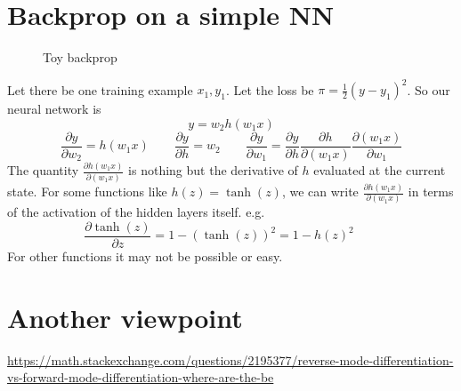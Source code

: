 \documentclass{article}
\newcommand{\beq}{\begin{equation}}
\newcommand{\eeq}{\end{equation}}
\newcommand{\pdd}[2]{\frac{\partial{#1}}{\partial{#2}}}
\begin{document}
\section{Backprop on a simple NN}
\begin{figure}
  \centering
{}
\caption{\label{fig:toybackprop} Toy backprop}
\end{figure}
Let there be one training example $x_1,y_1$. Let the loss be $\pi=\frac{1}{2}(y-y_1)^2$. So our neural network is
\beq
y = w_2h(w_1x)
\eeq
\beq
\pdd{y}{w_2} = h(w_1x) \qquad \pdd{y}{h}   = w_2 \qquad
\pdd{y}{w_1} = \pdd{y}{h}\pdd{h}{(w_1x)}\pdd{(w_1x)}{w_1}
\eeq
The quantity $\pdd{h(w_1x)}{(w_1x)}$ is nothing but the derivative of $h$ evaluated at the current state. For some functions like $h(z)=\tanh{(z)}$, we can write $\pdd{h(w_1x)}{(w_1x)}$ in terms of the activation of the hidden layers itself.
e.g.
\beq
\pdd{\tanh(z)}{z}= 1 - (\tanh{(z)})^2 = 1-h(z)^2 \qquad 
\eeq
For other functions it may not be possible or easy.

%
%
\section{Another viewpoint}
\url{https://math.stackexchange.com/questions/2195377/reverse-mode-differentiation-vs-forward-mode-differentiation-where-are-the-be}
\end{document}
